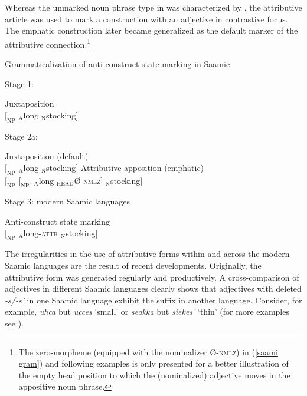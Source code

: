 {Whereas the unmarked noun phrase type in  was characterized by , the attributive article was used to mark a construction with an adjective in contrastive focus. The emphatic construction later became generalized as the default marker of the attributive connection.\footnote{The zero-morpheme (equipped with the nominalizer Ø-\textsc{nmlz}) in (\ref{saami gram}) and following examples is only presented for a better illustration of the empty head position to which the (nominalized) adjective moves in the appositive noun phrase.}
\begin{exe}
\label{saami gram}
\ex \rm{Grammaticalization of anti\hyp{}construct state marking in Saamic} 
\begin{xlist}
\ex \rm{Stage 1: }
\begin{xlist}
\ex \rm{Juxtaposition}\\
	$[_{\text{NP}}$ $_{\text{A}}$long $_{\text{N}}$stocking$]$
\end{xlist}
\ex \rm{Stage 2a: }
\begin{xlist}
\ex \rm{Juxtaposition (default)}\\
	$[_{\text{NP}}$ $_{\text{A}}$long $_{\text{N}}$stocking$]$
\ex \rm{Attributive apposition (emphatic)}\\
	$[_{\text{NP}}$ $[_{\text{NP'}}$ $_{\text{A}}$long $_{\text{HEAD}}$Ø-\textsc{nmlz}$]$ $_{\text{N}}$stocking$]$
\end{xlist}
\ex \rm{Stage 3: modern Saamic languages}
\begin{xlist}
\ex \rm{Anti\hyp{}construct state marking}\\
	$[_{\text{NP}}$ $_{\text{A}}$long-\textsc{attr} $_{\text{N}}$stocking$]$
\end{xlist}
\end{xlist}
\end{exe}
The irregularities in the use of attributive forms within and across the modern Saamic languages are the result of recent developments. Originally, the attributive form was generated regularly and productively. A cross-comparison of adjectives in different Saamic languages clearly shows that adjectives with deleted \textit{-s/-s'} in one Saamic language exhibit the suffix in another language. Consider, for example,  \textit{uhca} but  \textit{ucces} ‘small’ or  \textit{seakka} but  \textit{sie{\ng}{\ng}kes'} ‘thin’ (for more examples see \citealt{riesler2006b}).

}
